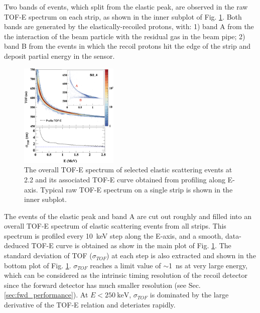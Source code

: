 \documentclass[number,5p]{elsarticle}
\begin{document}
Two bands of events, which split from the elastic peak, are observed in the raw TOF-E spectrum on each strip, as shown in the inner subplot of Fig. \ref{fig:tof-e}.
Both bands are generated by the elastically-recoiled protons, with: 1) band A from
the the interaction of the beam particle with the residual gas in the beam pipe; 2)
band B from the events in which the recoil protons hit the edge of the strip and
deposit partial energy in the sensor.
\begin{figure}[b!]
  \centering
  \includegraphics[width=0.42\textwidth]{./tofe_tsigma.png}
  \caption{
    The overall TOF-E spectrum of selected elastic scattering events at
    \SI{2.2}{\momentum} and its associated TOF-E curve obtained from profiling
    along E-axis.
    Typical raw TOF-E spectrum on a single strip is shown in the inner subplot.}
  \label{fig:tof-e}
\end{figure}
The events of the elastic peak and band A are cut out roughly and filled into an
overall TOF-E spectrum of elastic scattering events from all strips.
This spectrum is profiled every \SI{10}{\keV} step along the E-axis,  and a
smooth, data-deduced TOF-E curve is obtained as show in the main plot of Fig. \ref{fig:tof-e}.
The standard deviation of TOF ($\sigma_{TOF}$) at each step is also extracted and shown in the bottom plot of Fig. \ref{fig:tof-e}.
$\sigma_{TOF}$ reaches a limit value of $\sim$\SI{1}{\ns} at very large energy,
which can be considered as the intrinsic timing resolution of the recoil
detector since the forward detector has much smaller resolution (see Sec. \ref{sec:fwd_performance}).
At $E < \SI{250}{\keV}$, $\sigma_{TOF}$ is dominated by the large derivative
of the TOF-E relation and deteriates rapidly.
\end{document}
